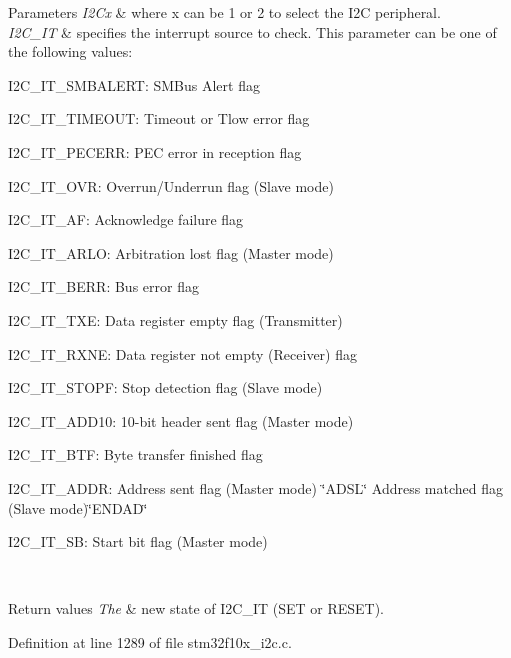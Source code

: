 \begin{DoxyParams}{Parameters}
{\em I2\+Cx} & where x can be 1 or 2 to select the I2C peripheral. \\
\hline
{\em I2\+C\+\_\+\+IT} & specifies the interrupt source to check. This parameter can be one of the following values\+: \begin{DoxyItemize}
\item I2\+C\+\_\+\+I\+T\+\_\+\+S\+M\+B\+A\+L\+E\+RT\+: S\+M\+Bus Alert flag \item I2\+C\+\_\+\+I\+T\+\_\+\+T\+I\+M\+E\+O\+UT\+: Timeout or Tlow error flag \item I2\+C\+\_\+\+I\+T\+\_\+\+P\+E\+C\+E\+RR\+: P\+EC error in reception flag \item I2\+C\+\_\+\+I\+T\+\_\+\+O\+VR\+: Overrun/\+Underrun flag (Slave mode) \item I2\+C\+\_\+\+I\+T\+\_\+\+AF\+: Acknowledge failure flag \item I2\+C\+\_\+\+I\+T\+\_\+\+A\+R\+LO\+: Arbitration lost flag (Master mode) \item I2\+C\+\_\+\+I\+T\+\_\+\+B\+E\+RR\+: Bus error flag \item I2\+C\+\_\+\+I\+T\+\_\+\+T\+XE\+: Data register empty flag (Transmitter) \item I2\+C\+\_\+\+I\+T\+\_\+\+R\+X\+NE\+: Data register not empty (Receiver) flag \item I2\+C\+\_\+\+I\+T\+\_\+\+S\+T\+O\+PF\+: Stop detection flag (Slave mode) \item I2\+C\+\_\+\+I\+T\+\_\+\+A\+D\+D10\+: 10-\/bit header sent flag (Master mode) \item I2\+C\+\_\+\+I\+T\+\_\+\+B\+TF\+: Byte transfer finished flag \item I2\+C\+\_\+\+I\+T\+\_\+\+A\+D\+DR\+: Address sent flag (Master mode) \char`\"{}\+A\+D\+S\+L\char`\"{} Address matched flag (Slave mode)\char`\"{}\+E\+N\+D\+A\+D\char`\"{} \item I2\+C\+\_\+\+I\+T\+\_\+\+SB\+: Start bit flag (Master mode) \end{DoxyItemize}
\\
\hline
\end{DoxyParams}

\begin{DoxyRetVals}{Return values}
{\em The} & new state of I2\+C\+\_\+\+IT (S\+ET or R\+E\+S\+ET). \\
\hline
\end{DoxyRetVals}


Definition at line 1289 of file stm32f10x\+\_\+i2c.\+c.

